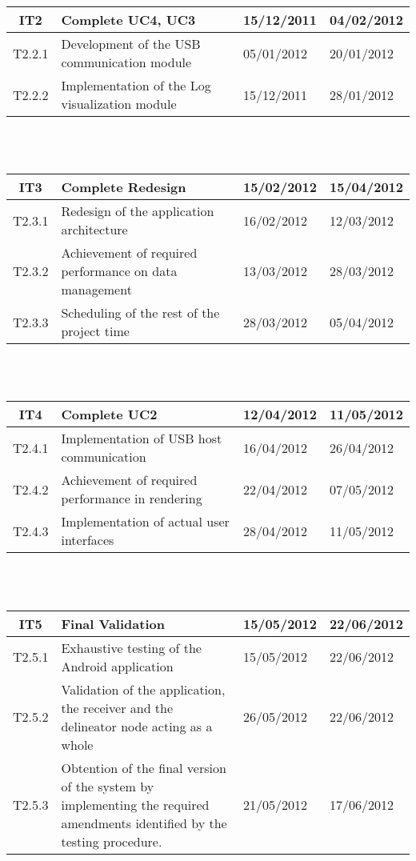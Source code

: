 		\begin{tabular}{| c | p{6cm} | l | l |} %
		\hline
IT2 & Complete UC4, UC3 & 15/12/2011 & 04/02/2012\\ \hline
   T2.2.1 & Development of the USB communication module & 05/01/2012 & 20/01/2012\\ \hline
   T2.2.2 & Implementation of the Log visualization module & 15/12/2011 & 28/01/2012\\ \hline
		\end{tabular}\\\\

		\begin{tabular}{| c | p{6cm} | l | l |} %
		\hline
IT3 & Complete Redesign & 15/02/2012 & 15/04/2012\\ \hline
   T2.3.1 & Redesign of the application architecture & 16/02/2012 & 12/03/2012\\ \hline
   T2.3.2 & Achievement of required performance on data management & 13/03/2012 & 28/03/2012\\ \hline
   T2.3.3 & Scheduling of the rest of the project time & 28/03/2012 & 05/04/2012\\
		\hline
		\end{tabular}\\\\

		\begin{tabular}{| c | p{6cm} | l | l |} %
		\hline
IT4 & Complete UC2 & 12/04/2012 & 11/05/2012\\ \hline
   T2.4.1 & Implementation of USB host communication & 16/04/2012 & 26/04/2012\\ \hline
   T2.4.2 & Achievement of required performance in rendering & 22/04/2012 & 07/05/2012\\ \hline
   T2.4.3 & Implementation of actual user interfaces & 28/04/2012 & 11/05/2012\\
		\hline
		\end{tabular}\\\\

		\begin{tabular}{| c | p{6cm} | l | l |} %
		\hline
IT5 & Final Validation & 15/05/2012 & 22/06/2012\\ \hline
   T2.5.1 & Exhaustive testing of the Android application & 15/05/2012 & 22/06/2012\\ \hline
   T2.5.2 & Validation of the application, the receiver and the delineator node acting as a whole & 26/05/2012 & 22/06/2012\\ \hline
   T2.5.3 & Obtention of the final version of the system by implementing the required amendments identified by the testing procedure. & 21/05/2012 & 17/06/2012\\
		\hline
		\end{tabular}\\\\


